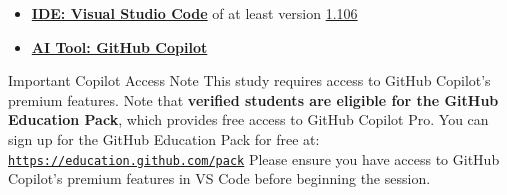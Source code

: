 \documentclass[11pt, a4paper]{article}
\begin{document}
\begin{itemize}
    \begin{codebox}
gcc --version                       # Must be >= 9.0 (for C11 support)
pkg-config --modversion libcurl     # Must be >= 7.81.0
pkg-config --modversion libxml-2.0  # Must be >= 2.9.13
    \end{codebox}
    \textbf{Compatibility:} Ubuntu 22.04 LTS (gcc 11, libcurl 7.81.0, libxml2 2.9.13) and Ubuntu 24.04 (gcc 13, libcurl 8.5.0, libxml2 2.9.14) both meet requirements.\newline
    \item \href{https://code.visualstudio.com/}{\textbf{IDE: Visual Studio Code}} of at least version \href{https://code.visualstudio.com/updates/v1_106}{1.106}
    \item \href{https://github.com/features/copilot}{\textbf{AI Tool: GitHub Copilot}}
\end{itemize}

\newpage

\begin{mainbox}{Important Copilot Access Note}
This study requires access to GitHub Copilot's premium features. Note that \textbf{verified students are eligible for the GitHub Education Pack}, which provides free access to GitHub Copilot Pro. You can sign up for the GitHub Education Pack for free at:
\href{https://education.github.com/pack}{\texttt{https://education.github.com/pack}}
\newline\newline
Please ensure you have access to GitHub Copilot's premium features in VS Code before beginning the session.
\end{mainbox}
\end{document}
